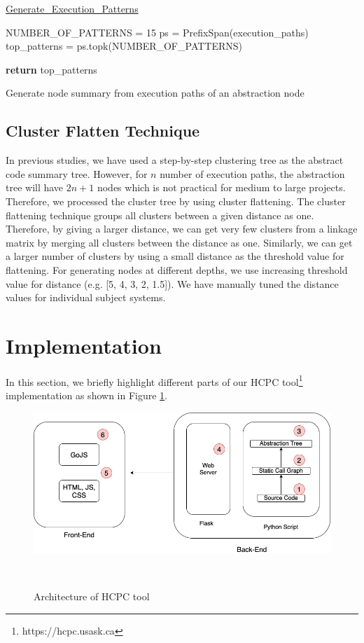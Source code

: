 \begin{algorithm}
    
    \underline{Generate\_Execution\_Patterns} 
    
    NUMBER\_OF\_PATTERNS = 15\;
    ps = PrefixSpan(execution\_paths)\;
    top\_patterns = ps.topk(NUMBER\_OF\_PATTERNS)\; 
    
    \textbf{return} top\_patterns\;
    \caption{Generate node summary from execution paths of an abstraction node}
    \label{alg:execution_patterns}
\end{algorithm}


\subsection{Cluster Flatten Technique}

In previous studies, we have used a step-by-step clustering tree as the abstract code summary tree. However, for $n$ number of execution paths, the abstraction tree will have $2n + 1$ nodes which is not practical for medium to large projects. Therefore, we processed the cluster tree by using cluster flattening. The cluster flattening technique groups all clusters between a given distance as one. Therefore, by giving a larger distance, we can get very few clusters from a linkage matrix by merging all clusters between the distance as one. Similarly, we can get a larger number of clusters by using a small distance as the threshold value for flattening. For generating nodes at different depths, we use increasing threshold value for distance (e.g. [5, 4, 3, 2, 1.5]). We have manually tuned the distance values for individual subject systems.



\section{Implementation }
\label{hla3:implementation}
In this section, we briefly highlight different parts of our HCPC tool\footnote{https://hcpc.usask.ca} implementation as shown in Figure \ref{fig:architecture}.

  \begin{figure}[h]
    \centering
    \includegraphics[width=\columnwidth]{figures/hla3/hla3_implementation.png}
    \caption{Architecture of HCPC tool }~\label{fig:architecture}
    \end{figure}

